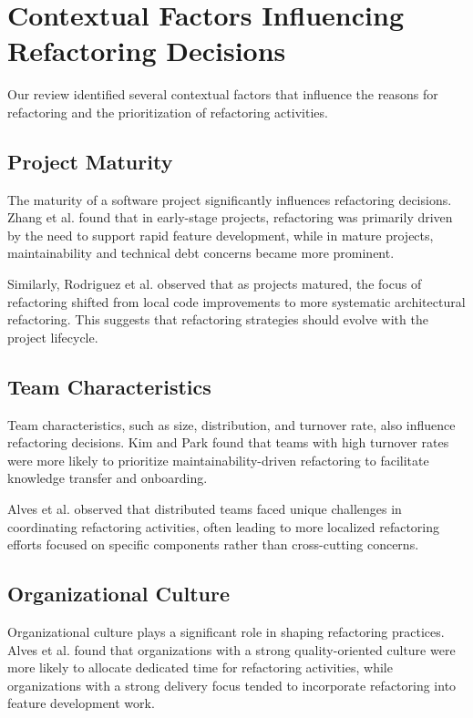 \documentclass[journal,onecolumn]{IEEEtran}
\begin{document}
\section{Contextual Factors Influencing Refactoring Decisions}
Our review identified several contextual factors that influence the reasons for refactoring and the prioritization of refactoring activities.

\subsection{Project Maturity}
The maturity of a software project significantly influences refactoring decisions. Zhang et al. \cite{zhang2024} found that in early-stage projects, refactoring was primarily driven by the need to support rapid feature development, while in mature projects, maintainability and technical debt concerns became more prominent.

Similarly, Rodriguez et al. \cite{rodriguez2022} observed that as projects matured, the focus of refactoring shifted from local code improvements to more systematic architectural refactoring. This suggests that refactoring strategies should evolve with the project lifecycle.

\subsection{Team Characteristics}
Team characteristics, such as size, distribution, and turnover rate, also influence refactoring decisions. Kim and Park \cite{kim2023} found that teams with high turnover rates were more likely to prioritize maintainability-driven refactoring to facilitate knowledge transfer and onboarding.

Alves et al. \cite{alves2023} observed that distributed teams faced unique challenges in coordinating refactoring activities, often leading to more localized refactoring efforts focused on specific components rather than cross-cutting concerns.

\subsection{Organizational Culture}
Organizational culture plays a significant role in shaping refactoring practices. Alves et al. \cite{alves2023} found that organizations with a strong quality-oriented culture were more likely to allocate dedicated time for refactoring activities, while organizations with a strong delivery focus tended to incorporate refactoring into feature development work.
\end{document}
